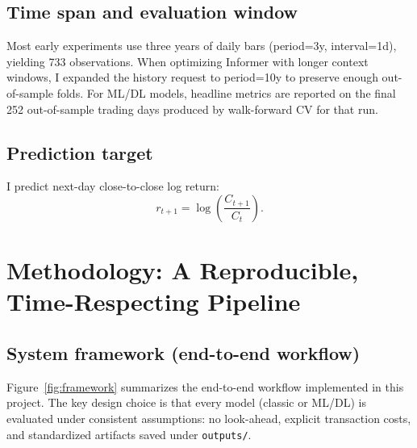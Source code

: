 \documentclass[12pt,a4paper,oneside]{report}
\begin{document}
\section{Time span and evaluation window}
Most early experiments use three years of daily bars (period=3y, interval=1d), yielding 733 observations. When optimizing Informer with longer context windows, I expanded the history request to period=10y to preserve enough out-of-sample folds. For ML/DL models, headline metrics are reported on the final 252 out-of-sample trading days produced by walk-forward CV for that run.

\section{Prediction target}
I predict next-day close-to-close log return:
\[
r_{t+1}=\log\left(\frac{C_{t+1}}{C_t}\right).
\]

\chapter{Methodology: A Reproducible, Time-Respecting Pipeline}
\section{System framework (end-to-end workflow)}
Figure~\ref{fig:framework} summarizes the end-to-end workflow implemented in this project. The key design choice is that every model (classic or ML/DL) is evaluated under consistent assumptions: no look-ahead, explicit transaction costs, and standardized artifacts saved under \texttt{outputs/}.
\end{document}
